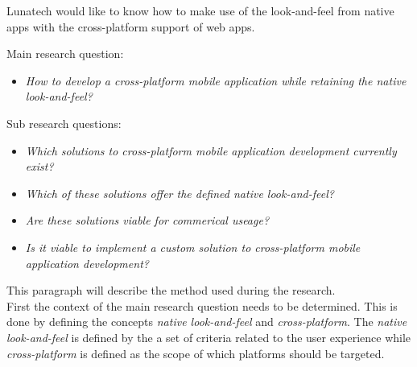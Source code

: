 Lunatech would like to know how to make use of the look-and-feel from native apps with the cross-platform support of web apps.


Main research question:
\begin{itemize}
\item \emph{How to develop a cross-platform mobile application while retaining the native look-and-feel?}
\end{itemize}

\noindent Sub research questions:
\begin{itemize}
\item \emph{Which solutions to cross-platform mobile application development currently exist?}
\item \emph{Which of these solutions offer the defined native look-and-feel?}
\item \emph{Are these solutions viable for commerical useage?}
\item \emph{Is it viable to implement a custom solution to cross-platform mobile application development?}
\end{itemize}


This paragraph will describe the method used during the research.\\

First the context of the main research question needs to be determined. This is done by defining the concepts \emph{native look-and-feel} and \emph{cross-platform}. The \emph{native look-and-feel} is defined by the a set of criteria related to the user experience while \emph{cross-platform} is defined as the scope of which platforms should be targeted.




